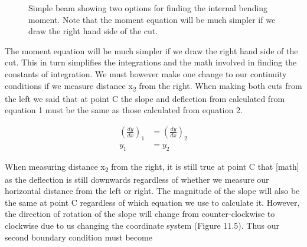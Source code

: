 \documentclass[
  letterpaper,
  DIV=11,
  numbers=noendperiod]{scrreprt}
\theoremstyle{definition}
\theoremstyle{remark}
\begin{document}
\begin{figure}


\caption{\label{fig-11.4}Simple beam showing two options for finding the
internal bending moment. Note that the moment equation will be much
simpler if we draw the right hand side of the cut.}

\end{figure}%

The moment equation will be much simpler if we draw the right hand side
of the cut. This in turn simplifies the integrations and the math
involved in finding the constants of integration. We must however make
one change to our continuity conditions if we measure distance
x\textsubscript{2} from the right. When making both cuts from the left
we said that at point C the slope and deflection from calculated from
equation 1 must be the same as those calculated from equation 2.

\[
\begin{aligned}
\left(\frac{d y}{d x}\right)_{1} & =\left(\frac{d y}{d x}\right)_{2} \\
y_{1} & =y_{2}
\end{aligned}
\]

When measuring distance x\textsubscript{2} from the right, it is still
true at point C that {[}math{]} as the deflection is still downwards
regardless of whether we measure our horizontal distance from the left
or right. The magnitude of the slope will also be the same at point C
regardless of which equation we use to calculate it. However, the
direction of rotation of the slope will change from counter-clockwise to
clockwise due to us changing the coordinate system (Figure 11.5). Thus
our second boundary condition must become
\end{document}
